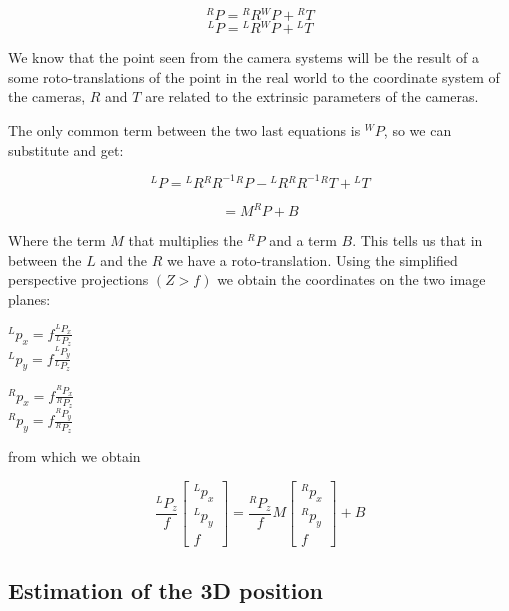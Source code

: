 \[
    {}^RP = {}^RR{}^WP+{}^RT
\]
\[
    {}^LP = {}^LR{}^WP+{}^LT  
\]

We know that the point seen from the camera systems will be the result of a some roto-translations of the point in the real world to the coordinate system of the cameras, \(R\) and \(T\) are related to the extrinsic parameters of the cameras.

The only common term between the two last equations is \({}^WP\), so we can substitute and get:

\[
    {}^LP = {}^LR{}^RR^{-1}{}^RP-{}^LR{}^RR^{-1}{}^RT+{}^LT
\]

\[
    = M^RP+B
\]

Where the term \(M\) that multiplies the \({}^RP\) and a term \(B\). This tells us that in between the \(L\) and the \(R\) we have a roto-translation. Using the simplified perspective projections $(Z > f)$ we obtain the coordinates on the two image planes:

\begin{multicols}{2}

\(
    {}^Lp_x = f\frac{{}^LP_x}{{}^LP_z}  
\) \\
\(
    {}^Lp_y = f\frac{{}^LP_y}{{}^LP_z}
\)

\end{multicols}

\begin{multicols}{2}

\(
    {}^Rp_x = f\frac{{}^RP_x}{{}^RP_z}  
\) \\
\(
    {}^Rp_y = f\frac{{}^RP_y}{{}^RP_z}
\)
    
\end{multicols}

from which we obtain 

\[
    \frac{{}^LP_z}{f}
    \begin{bmatrix}
        {}^Lp_x \\
        {}^Lp_y \\
        f
    \end{bmatrix}
    =
    \frac{{}^RP_z}{f}
    M
    \begin{bmatrix}
        {}^Rp_x \\
        {}^Rp_y \\
        f 
    \end{bmatrix}
    + B
\]

\subsection{Estimation of the 3D position}

